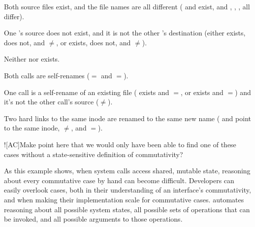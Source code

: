 \begin{CompactItemize}
\item Both source files exist, and the file names are all different
      ( and  exist, and , , ,
       all differ).

\item One 's source does not exist, and it is not the
      other 's destination (either
       exists,  does not, and $\neq$, or
       exists,  does not, and $\neq$).

\item Neither  nor  exists.

\item Both calls are self-renames ($=$ and $=$).

\item One call is a self-rename of an existing file
      ( exists and $=$, or
        exists and $=$) and
      it's not the other call's source ($\neq$).

\item Two hard links to the same inode are renamed to the same new name
      ( and  point to the same inode,
       $\neq$, and $=$).

\end{CompactItemize}

\XXX![AC]{Make point here that we would only have been able to find
  one of these cases without a state-sensitive definition of
  commutativity?}

As this example shows, when system calls access shared, mutable
state, reasoning about every commutative case by hand can become
difficult.
%
Developers can easily overlook cases, both in their
understanding of an interface's commutativity, and when making their
implementation scale for commutative cases.
%
\analyzer
automates reasoning about all possible system states, all possible
sets of operations that can be
invoked, and all possible arguments to those operations.



